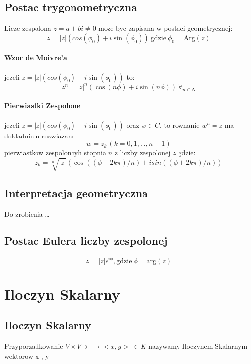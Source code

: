 \documentclass[a4paper]{article}
\begin{document}
\subsection{Postac trygonometryczna}
Licze zespolona $z = a + bi \ne 0$ moze byc zapisana w postaci geometrycznej:
\begin{equation}
    z = |z|(cos(\phi_0) + i\sin(\phi_0)) \ \text{gdzie} \ \phi_0 = \text{Arg}(z)
\end{equation}
\paragraph{Wzor de Moivre'a}
jezeli $    z = |z|(cos(\phi_0) + i\sin(\phi_0))$ to:
\begin{equation}
    z^{n} = |z|^{n}(\cos(n\phi)+ i\sin(n\phi)) \ \forall_{n \in N}
\end{equation}
\paragraph{Pierwiastki Zespolone}
jezeli $    z = |z|(cos(\phi_0) + i\sin(\phi_0))$ oraz $w \in C$, to rownanie $w^{n} = z$ ma dokladnie n rozwiazan:
\begin{equation}
    w = z_{k} \ (k = 0,1, \ldots , n -1)
\end{equation}
pierwiastkow zespoloncyh stopnia $n$ z liczby zespolonej $z$ gdzie:
\begin{equation}
z_{k} = \sqrt[n]{|z|}(\cos((\phi + 2k\pi)/n)+ i sin((\phi + 2k\pi)/n))
\end{equation}
\subsection{Interpretacja geometryczna}
Do zrobienia \ldots
\subsection{Postac Eulera liczby zespolonej}
\begin{equation}
    z = |z|e^{i\phi}, \text{gdzie} \ \phi = \text{arg}(z)
\end{equation}
\clearpage
\section{Iloczyn Skalarny}
\subsection{Iloczyn Skalarny}
Przyporzadkowanie $V \times V \ni \ \rightarrow <x,y> \ \in K$ nazywamy Iloczynem Skalarnym wektorow x , y
\end{document}
